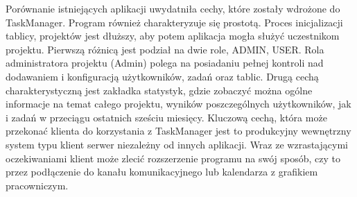 \indent Porównanie istniejących aplikacji uwydatniła cechy, które zostały wdrożone do TaskManager. Program również charakteryzuje się prostotą. Proces inicjalizacji tablicy, projektów jest dłuższy, aby potem aplikacja mogła służyć uczestnikom projektu.
Pierwszą różnicą jest podział na dwie role, ADMIN, USER. Rola administratora projektu (Admin) polega na posiadaniu pełnej kontroli nad dodawaniem i konfiguracją użytkowników, zadań oraz tablic.
Drugą cechą charakterystyczną jest zakładka statystyk, gdzie zobaczyć można ogólne informacje na temat całego projektu, wyników poszczególnych użytkowników, jak i zadań w przeciągu ostatnich sześciu miesięcy.
Kluczową cechą, która może przekonać klienta do korzystania z TaskManager jest to produkcyjny wewnętrzny system typu klient serwer  niezależny od innych aplikacji. Wraz ze wzrastającymi oczekiwaniami klient może zlecić rozszerzenie programu na swój sposób, czy to przez podłączenie do kanału komunikacyjnego lub kalendarza z grafikiem pracowniczym.





